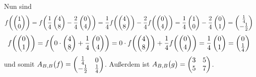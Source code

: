 \documentclass{scrreprt}
\begin{document}
\begin{enumerate}[(a)]
  Nun sind
  \[
    f\qty(\begin{pmatrix} 1 \\ 0 \end{pmatrix})
    = f\qty(\frac{1}{4}\begin{pmatrix} 4 \\ 8 \end{pmatrix} - \frac{2}{4}\begin{pmatrix} 0 \\ 4 \end{pmatrix})
    = \frac{1}{4}f\qty(\begin{pmatrix} 4 \\ 8 \end{pmatrix}) - \frac{2}{4}f\qty(\begin{pmatrix} 0 \\ 4 \end{pmatrix})
    = \frac{1}{4}\begin{pmatrix} 1 \\ 0 \end{pmatrix} - \frac{2}{4}\begin{pmatrix} 0 \\ 1 \end{pmatrix}
    = \begin{pmatrix} \frac{1}{4} \\ -\frac{1}{2} \end{pmatrix}
  \]
  \[
    f\qty(\begin{pmatrix} 0 \\ 1 \end{pmatrix})
    = f\qty(0 \cdot \begin{pmatrix} 4 \\ 8 \end{pmatrix} + \frac{1}{4}\begin{pmatrix} 0 \\ 4 \end{pmatrix})
    = 0 \cdot f\qty(\begin{pmatrix} 4 \\ 8 \end{pmatrix}) + \frac{1}{4}f\qty(\begin{pmatrix} 0 \\ 4 \end{pmatrix})
    = \frac{1}{4}\begin{pmatrix} 0 \\ 1 \end{pmatrix}
    = \begin{pmatrix} 0 \\ \frac{1}{4} \end{pmatrix}
  \]
  und somit $A_{B, B}\qty\big(f) = \begin{pmatrix}
    \frac{1}{4}  & 0           \\
    -\frac{1}{2} & \frac{1}{4} \\
  \end{pmatrix}$.
  Außerdem ist $A_{B, B}\qty\big(g) = \begin{pmatrix}
    3 & 5 \\
    5 & 7 \\
  \end{pmatrix}$.


\end{enumerate}
\end{document}
